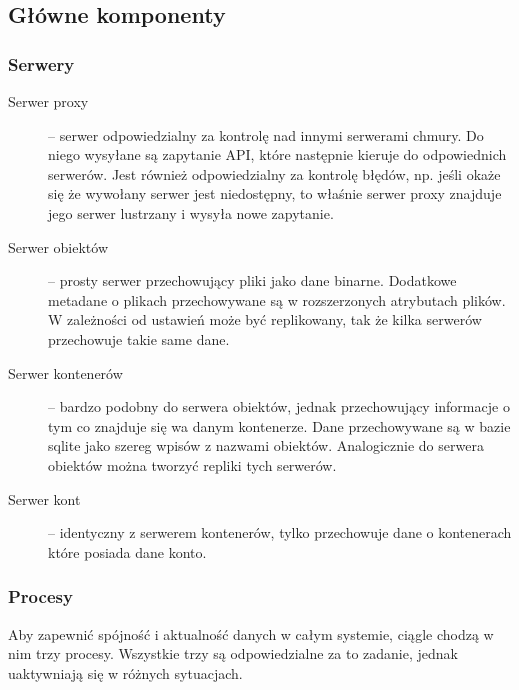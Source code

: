 \subsection{Główne komponenty}\label{sub:glowne komponenty}

\subsubsection{Serwery}\label{sub:serwery}

\begin{description}
\item[Serwer proxy] -- serwer odpowiedzialny za kontrolę nad innymi serwerami chmury. Do niego wysyłane są zapytanie API, które następnie kieruje do odpowiednich serwerów. Jest również odpowiedzialny za kontrolę błędów, np. jeśli okaże się że wywołany serwer jest niedostępny, to właśnie serwer proxy znajduje jego serwer lustrzany i wysyła nowe zapytanie.
\item[Serwer obiektów] -- prosty serwer przechowujący pliki jako dane binarne. Dodatkowe metadane o plikach przechowywane są w rozszerzonych atrybutach plików. W zależności od ustawień może być replikowany, tak że kilka serwerów przechowuje takie same dane.
\item[Serwer kontenerów] -- bardzo podobny do serwera obiektów, jednak przechowujący informacje o tym co znajduje się wa danym kontenerze. Dane przechowywane są w bazie sqlite jako szereg wpisów z nazwami obiektów. Analogicznie do serwera obiektów można tworzyć repliki tych serwerów.
\item[Serwer kont] -- identyczny z serwerem kontenerów, tylko przechowuje dane o kontenerach które posiada dane konto.
\end{description}

\subsubsection{Procesy}\label{sub:procesy}

Aby zapewnić spójność i aktualność danych w całym systemie, ciągle chodzą w nim trzy procesy. Wszystkie trzy są odpowiedzialne za to zadanie, jednak uaktywniają się w różnych sytuacjach.

